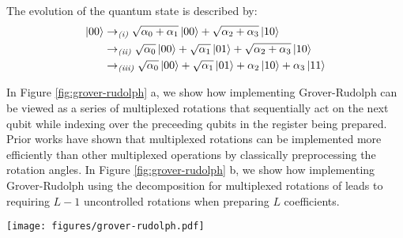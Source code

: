 The evolution of the quantum state is described by:
\begin{equation}
    \begin{split}
        \ket{00} &\rightarrow_{\textit{(i)}} \sqrt{\alpha_0 + \alpha_1} \ket{00} + \sqrt{\alpha_2 + \alpha_3} \ket{10} \\
        &\rightarrow_{\textit{(ii)}} \sqrt{\alpha_0} \ket{00} + \sqrt{\alpha_1} \ket{01} + \sqrt{\alpha_2 + \alpha_3} \ket{10} \\
        &\rightarrow_{\textit{(iii)}} \sqrt{\alpha_0} \ket{00} + \sqrt{\alpha_1} \ket{01} + \alpha_2 \ket{10} + \alpha_3 \ket{11}
    \end{split}
\end{equation}

In Figure \ref{fig:grover-rudolph} a, we show how implementing Grover-Rudolph can be viewed as a series of multiplexed rotations that sequentially act on the next qubit while indexing over the preceeding qubits in the register being prepared.
Prior works \cite{mottonen2004transformation, low2021halving} have shown that multiplexed rotations can be implemented more efficiently than other multiplexed operations by classically preprocessing the rotation angles. 
In Figure \ref{fig:grover-rudolph} b, we show how implementing Grover-Rudolph using the decomposition for multiplexed rotations of \cite{mottonen2004transformation} leads to requiring $L-1$ uncontrolled rotations when preparing $L$ coefficients.

\begin{figure*}
    \centering
    \texttt{[image: figures/grover-rudolph.pdf]}
    \caption{
        \textbf{Grover-Rudolph Circuit Compilation.} 
        This figure shows an implementation of the Grover-Rudolph algorithm using multiplexed rotations when preparing 8 coefficients.
        The left subfigure shows the circuit diagram explicitly written as multiplexors, while the right subfigure shows the circuit when the multiplexed rotations are decomposed via \cite{mottonen2004transformation}.
        This circuit requires 7 rotations and the angles of the rotations are changed ($\theta_i \rightarrow \alpha_i$) based on classical preprocessing.
    }
    \label{fig:grover-rudolph}
\end{figure*}
